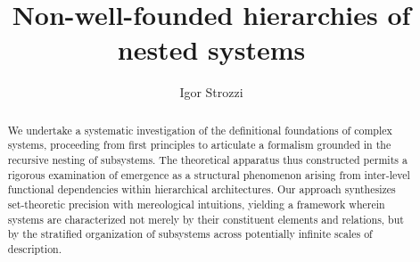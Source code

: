 \documentclass[runningheads, citeauthoryear]{llncs}
\begin{document}
\title{Non-well-founded hierarchies of nested systems}

\author{Igor Strozzi}

\maketitle

\begin{abstract}
We undertake a systematic investigation of the definitional foundations of complex systems, proceeding from first principles to articulate a formalism grounded in the recursive nesting of subsystems. The theoretical apparatus thus constructed permits a rigorous examination of emergence as a structural phenomenon arising from inter-level functional dependencies within hierarchical architectures. Our approach synthesizes set-theoretic precision with mereological intuitions, yielding a framework wherein systems are characterized not merely by their constituent elements and relations, but by the stratified organization of subsystems across potentially infinite scales of description.

\end{abstract}








%

\end{document}
